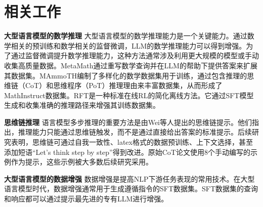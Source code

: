 \section{相关工作}
\label{sec:relatedwork}

\textbf{大型语言模型的数学推理  } 大型语言模型的数学推理能力是一个关键能力\citep{yuan2023well}。通过数学相关的预训练\citep{lightman2023let}和数学相关的监督微调\citep{yu2024metamathbootstrapmathematicalquestions}，LLM的数学推理能力可以得到增强。为了通过监督微调提升数学推理能力，这种方法通常涉及利用更大规模的模型或手动收集高质量数据\citep{tao2024survey}。MetaMath\citep{yu2023metamath}通过重写数学查询并在LLM的帮助下提供答案来扩展其数据集。MAmmoTH\citep{yue2309mammoth}编制了多样化的数学数据集用于训练，通过包含推理的思维链（CoT）和思维程序（PoT）推理理由来丰富数据集，从而形成了MathInstruct数据集。RFT\citep{yuan2023scaling}是一种标准在线RL的简化离线方法。它通过SFT模型生成和收集准确的推理路径来增强其训练数据集。

\textbf{思维链推理 } 语言模型多步推理的重要方法是由Wei等人\citep{wei2022chain}提出的思维链提示。他们指出，推理能力只能通过思维链触发，而不是通过直接给出答案的标准提示。后续研究表明，思维链可通过自我一致性\citep{wang2022self}、latex格式的数据预训练\citep{lewkowycz2022solving}、上下文选择\citep{creswell2022selection}，甚至添加短语“Let’s think step by step”\citep{kojima2022large}得到改进。原始CoT论文使用8个手动编写的示例作为提示，这些示例被大多数后续研究采用。

\textbf{大型语言模型的数据增强 }  数据增强是提高NLP下游任务表现的常用技术\citep{feng-etal-2021-survey}。在大型语言模型时代，数据增强通常用于生成遵循指令的SFT数据集\citep{wang-etal-2023-self-instruct}。SFT数据集的查询和响应\citep{ding2023enhancing}都可以通过提示最先进的专有LLM进行增强。

